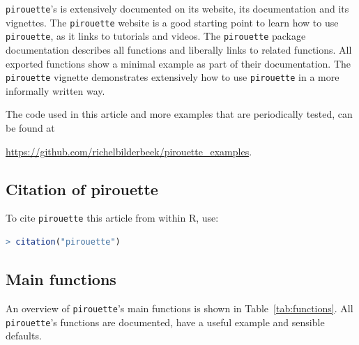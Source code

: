 \verb;pirouette;'s is extensively documented on its website,
its documentation and its vignettes.
The \verb;pirouette; website is a good starting point to learn
how to use \verb;pirouette;, as it links to tutorials and videos.
The \verb;pirouette; package documentation describes
all functions and liberally links to related functions.
All exported functions show a minimal example as part of their documentation.
The \verb;pirouette; vignette demonstrates extensively how 
to use \verb;pirouette; in a more informally written way. 

The code used in this article and more examples that are periodically 
tested, can be found at
\begin{sloppypar}
  \url{https://github.com/richelbilderbeek/pirouette_examples}. 
\end{sloppypar}

\subsection{Citation of pirouette}
\label{subsec:citation}

To cite \verb;pirouette; this article from within R, use:

\begin{lstlisting}[language=R]
> citation("pirouette")
\end{lstlisting}

\subsection{Main functions}
\label{subsec:main_functions}

An overview of \verb;pirouette;'s main functions is shown in 
Table~\ref{tab:functions}. 
All \verb;pirouette;'s functions are documented,
have a useful example and sensible defaults.

